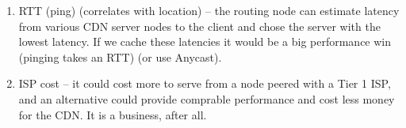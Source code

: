 \documentclass{report}
\begin{document}
\begin{problem}
\begin{answer}{24em}
\begin{enumerate}
\begin{enumerate}
    \item RTT (ping) (correlates with location) -- the routing node can
          estimate latency from various CDN server nodes to the client and chose
          the server with the lowest latency. If we cache these latencies it
          would be a big performance win (pinging takes an RTT) (or use Anycast).

    \item ISP cost -- it could cost more to serve from a node peered with a Tier
          1 ISP, and an alternative could provide comprable performance and
          cost less money for the CDN. It is a business, after all.
    \end{enumerate}

  \end{enumerate}
\end{answer}

\end{problem}
\end{document}
